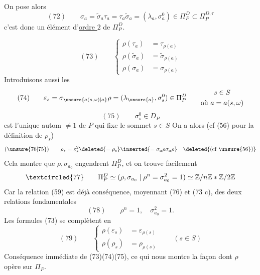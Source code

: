On pose alors
\[
(72)\qquad \sigma_a=\widetilde\sigma_a\tau_a=\tau_a\widetilde\sigma_a
=(\lambda_a,\sigma_a^0)\in\Pi_P^D\subset\Pi_P^{D,\tau}
\]
c'est donc un élément d'\uline{ordre $2$} de $\Pi_P^D$.

\[
(73)\qquad
\left\{
\begin{aligned}
\rho(\tau_a)&=\tau_{\rho(a)}\\
\rho(\widetilde\sigma_a)&=\widetilde\sigma_{\rho(a)}\\
\rho(\sigma_a)&=\sigma_{\rho(a)}
\end{aligned}
\right.
\]
Introduisons aussi les
\[
(74)\qquad
\varepsilon_s=\sigma_{\unsure{a(s,\omega)|a}}\rho
=(\lambda_{\unsure{a}},\sigma_s^0)\in\Pi_P^D
\qquad
\begin{gathered}
s\in S\\
\text{où }a=a(s,\omega)
\end{gathered}
\]
\[
(75)\qquad \sigma_s^0\in D_P
\]
est l'unique autom $\ne1$ de $P$ qui fixe le sommet $s\in S$
On a alors (cf (56) pour la définition de $\rho_s$)
\[
(\unsure{76|75})\qquad
\rho_s=\varepsilon_s^2\deleted{=\rho_s}\inserted{=\sigma_a\rho\sigma_a\rho}
\quad\deleted{(\text{cf }\unsure{56})}
\]
Cela  montre que $\rho,\sigma_{a_0}$ engendrent $\Pi_P^D$, et on trouve facilement
\[
\textcircled{77}\qquad
\Pi_P^D\simeq(\rho,\sigma_{a_0}\mid\rho^n=\sigma_{a_0}^2=1)
\simeq\mathbb Z/n\mathbb Z*\mathbb Z/2\mathbb Z
\]
Car la relation (59) est déjà conséquence, moyennant (76) et (73 c), des deux relations fondamentales
\[
(78)\qquad \rho^n=1,\quad\sigma_{a_0}^2=1.
\]
Les formules (73) se complètent en
\[
(79)\qquad
\left\{
\begin{aligned}
\rho(\varepsilon_s)&=\varepsilon_{\rho(s)}\\
\rho(\rho_s)&=\rho_{\rho(s)}
\end{aligned}
\right.
\qquad(s\in S)
\]
Conséquence immédiate de (73)(74)(75), ce qui nous montre la façon dont $\rho$ opère sur $\Pi_P$.

